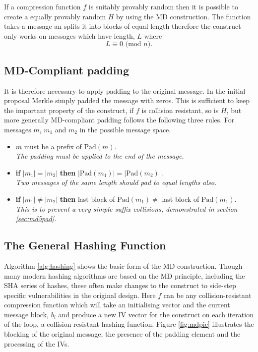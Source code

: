 \documentclass[a4paper,12pt]{article}
\newcommand{\Pad}{\text{Pad}}
\begin{document}
If a compression function $f$ is suitably provably random then it is possible to create a equally provably random $H$ by using the MD construction. The function takes a message an splits it into blocks of equal length therefore the construct only works on messages which have length, $L$ where $$L \equiv 0 \text{ (mod } n).$$

\subsection{MD-Compliant padding}
It is therefore necessary to apply padding to the original message. In the initial proposal Merkle simply padded the message with zeros\cite{Merkle1979}. This is sufficient to keep the important property of the construct, if $f$ is collision resistant, so is $H$, but more generally MD-compliant padding follows the following three rules. For messages $m$, $m_1$ and $m_2$ in the possible message space.
\begin{itemize}
    \item $m$ must be a prefix of $\Pad(m)$.\\\emph{The padding must be applied to the end of the message.}
    \item \textbf{if} $|m_1| = |m_2|$ \textbf{then} $|\Pad(m_1)| = |\Pad(m_2)|$.\\\emph{Two messages of the same length should pad to equal lengths also.}
    \item \textbf{if} $|m_1| \neq |m_2|$ \textbf{then} last block of $\Pad(m_1) \neq$ last block of $\Pad(m_1)$.\\\emph{This is to prevent a very simple suffix collisions, demonstrated in section \ref{sec:md5pad}.}
\end{itemize}

\subsection{The General Hashing Function}
Algorithm \ref{alg:hashing} shows the basic form of the MD construction. Though many modern hashing algorithms are based on the MD principle, including the SHA series \cite{fips} of hashes, these often make changes to the construct to side-step specific vulnerabilities in the original design. Here $f$ can be any collision-resistant compression function which will take an initialising vector and the current message block, $b_i$ and produce a new IV vector for the construct on each iteration of the loop, a collision-resistant hashing function. Figure \ref{fig:mdpic} illustrates the blocking of the original message, the presence of the padding element and the processing of the IVs.
\end{document}
